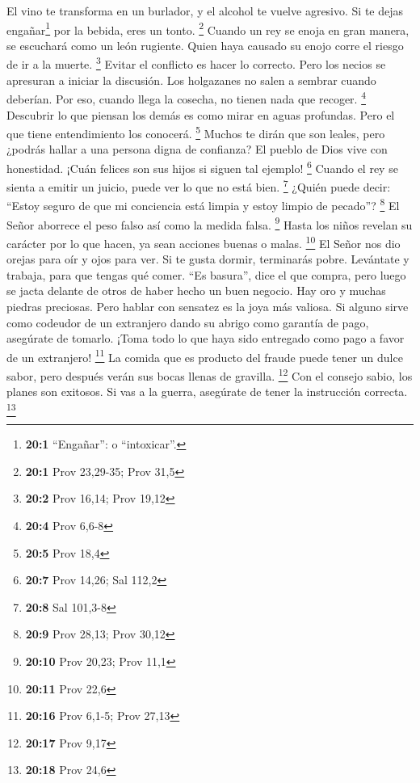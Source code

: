  El vino te transforma en un burlador, y el alcohol te
vuelve agresivo. Si te dejas engañar\footnote{\textbf{20:1} ``Engañar'':
  o ``intoxicar''.} por la bebida, eres un tonto. \footnote{\textbf{20:1}
  Prov 23,29-35; Prov 31,5}  Cuando un rey se enoja en
gran manera, se escuchará como un león rugiente. Quien haya causado su
enojo corre el riesgo de ir a la muerte. \footnote{\textbf{20:2} Prov
  16,14; Prov 19,12}  Evitar el conflicto es hacer lo
correcto. Pero los necios se apresuran a iniciar la discusión.
 Los holgazanes no salen a sembrar cuando deberían. Por
eso, cuando llega la cosecha, no tienen nada que recoger. \footnote{\textbf{20:4}
  Prov 6,6-8}  Descubrir lo que piensan los demás es como
mirar en aguas profundas. Pero el que tiene entendimiento los conocerá.
\footnote{\textbf{20:5} Prov 18,4}  Muchos te dirán que
son leales, pero ¿podrás hallar a una persona digna de confianza?
 El pueblo de Dios vive con honestidad. ¡Cuán felices son
sus hijos si siguen tal ejemplo! \footnote{\textbf{20:7} Prov 14,26; Sal
  112,2}  Cuando el rey se sienta a emitir un juicio,
puede ver lo que no está bien. \footnote{\textbf{20:8} Sal 101,3-8}
 ¿Quién puede decir: ``Estoy seguro de que mi conciencia
está limpia y estoy limpio de pecado''? \footnote{\textbf{20:9} Prov
  28,13; Prov 30,12}  El Señor aborrece el peso falso así
como la medida falsa. \footnote{\textbf{20:10} Prov 20,23; Prov 11,1}
 Hasta los niños revelan su carácter por lo que hacen, ya
sean acciones buenas o malas. \footnote{\textbf{20:11} Prov 22,6}
 El Señor nos dio orejas para oír y ojos para ver.
 Si te gusta dormir, terminarás pobre. Levántate y
trabaja, para que tengas qué comer.  ``Es basura'', dice
el que compra, pero luego se jacta delante de otros de haber hecho un
buen negocio.  Hay oro y muchas piedras preciosas. Pero
hablar con sensatez es la joya más valiosa.  Si alguno
sirve como codeudor de un extranjero dando su abrigo como garantía de
pago, asegúrate de tomarlo. ¡Toma todo lo que haya sido entregado como
pago a favor de un extranjero! \footnote{\textbf{20:16} Prov 6,1-5; Prov
  27,13}  La comida que es producto del fraude puede
tener un dulce sabor, pero después verán sus bocas llenas de gravilla.
\footnote{\textbf{20:17} Prov 9,17}  Con el consejo
sabio, los planes son exitosos. Si vas a la guerra, asegúrate de tener
la instrucción correcta. \footnote{\textbf{20:18} Prov 24,6}
